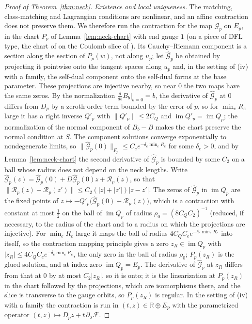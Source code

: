 \documentclass[11pt]{amsart}
\theoremstyle{definition}
\theoremstyle{remark}
\theoremstyle{plain}
\numberwithin{equation}{section}
\newcommand{\RR}{\mathbb{R}}
\newcommand{\im}{\operatorname{im}}
\begin{document}
\begin{proof}[Proof of Theorem~\ref{thm:neck}]
\emph{Existence and local uniqueness.} The matching, class-matching and Lagrangian conditions
are nonlinear, and an affine contraction does not preserve them. We therefore run the
contraction for the map $\mathcal G_p$ on $E_p$, in the chart $P_p$ of
Lemma~\ref{lem:neck-chart} with end gauge $1$ (on a piece of DFL type, the chart of
\cite[Section~4.1]{DFL} on the Coulomb slice of \cite[Proposition~4.6]{DFL}). Its
Cauchy--Riemann component is a section along the section of $P_p(w)$, not along $u_p$; let
$\widehat{\mathcal G}_p$ be obtained by projecting it pointwise onto the tangent spaces along
$u_p$ and, in the setting of (iv) with a family, the self-dual component onto the self-dual
forms at the base parameter. These projections are injective nearby, so near $0$ the two maps
have the same zeros. By the normalization $\frac{d}{db}B_b|_{b=0}=b$, the derivative of
$\widehat{\mathcal G}_p$ at $0$ differs from $D_p$ by a zeroth-order term bounded by the error of
$p$, so for $\min_eR_e$ large it has a right inverse $Q'_p$ with $\|Q'_p\|\le2C_Q$ and
$\im Q'_p=\im Q_p$; the normalization of the normal component of $B_b-B$ makes the chart
preserve the normal condition at $S$. The component solutions converge exponentially to
nondegenerate limits, so $\|\widehat{\mathcal G}_p(0)\|_{F_p}\le C_ee^{-\delta_e\min_eR_e}$ for
some $\delta_e>0$, and by Lemma~\ref{lem:neck-chart} the second derivative of
$\widehat{\mathcal G}_p$ is bounded by some $C_2$ on a ball whose radius does not depend on the
neck lengths. Write $\widehat{\mathcal G}_p(z)=\widehat{\mathcal G}_p(0)+D\widehat{\mathcal G}_p(0)z
+\mathcal R_p(z)$, so that $\|\mathcal R_p(z)-\mathcal R_p(z')\|\le C_2(|z|+|z'|)|z-z'|$. The zeros of
$\widehat{\mathcal G}_p$ in $\im Q_p$ are the fixed points of
$z\mapsto-Q'_p\bigl(\widehat{\mathcal G}_p(0)+\mathcal R_p(z)\bigr)$, which is a contraction with constant
at most $\frac12$ on the ball of $\im Q_p$ of radius $\rho_0=(8C_QC_2)^{-1}$ (reduced, if
necessary, to the radius of the chart and to a radius on which the projections are injective). For $\min_eR_e$ large it maps the ball of radius
$4C_QC_ee^{-\delta_e\min_eR_e}$ into itself, so the contraction mapping principle gives a zero
$z_R\in\im Q_p$ with $|z_R|\le4C_QC_ee^{-\delta_e\min_eR_e}$, the only zero in the ball of
radius $\rho_0$; $P_p(z_R)$ is the glued solution, and at index zero $\im Q_p=E_p$. The derivative
of $\widehat{\mathcal G}_p$ at $z_R$ differs from that at $0$ by at most $C_2|z_R|$, so it is onto;
it is the linearization at $P_p(z_R)$ in the chart followed by the projections, which are
isomorphisms there, and the slice is transverse to the gauge orbits, so $P_p(z_R)$ is regular.
In the setting of (iv) with a family the contraction is run in $(t,z)\in\RR\oplus E_p$ with the
parametrized operator $(t,z)\mapsto D_pz+t\,\partial_\lambda\mathcal F$.


\end{proof}
\end{document}
